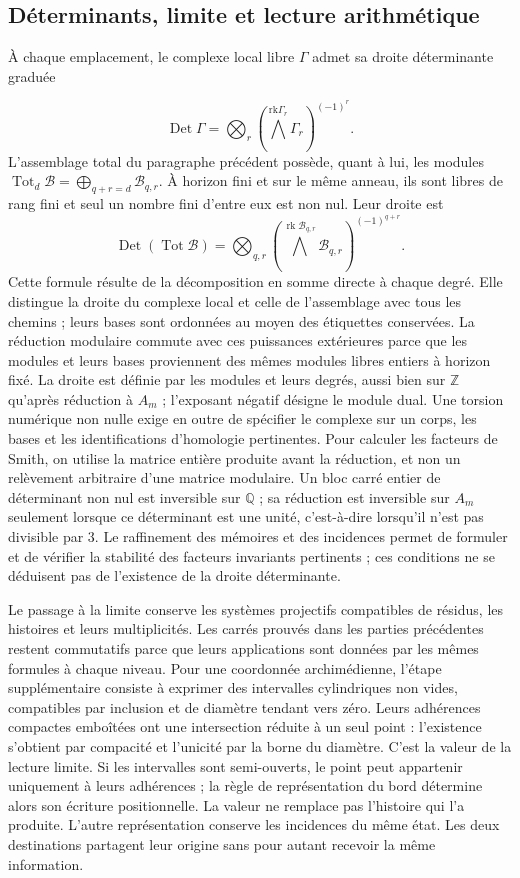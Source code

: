 \subsection{Déterminants, limite et lecture arithmétique}
À chaque emplacement, le complexe local libre \(\Gamma\) admet sa droite déterminante graduée

\[
\operatorname{Det}\Gamma=
\bigotimes_r\left(\bigwedge^{\mathrm{rk}\Gamma_r}\Gamma_r\right)^{(-1)^r}.
\]
L'assemblage total du paragraphe précédent possède, quant à lui, les modules \(\operatorname{Tot}_d\mathcal B=\bigoplus_{q+r=d}\mathcal B_{q,r}\). À horizon fini et sur le même anneau, ils sont libres de rang fini et seul un nombre fini d'entre eux est non nul. Leur droite est
\[
\operatorname{Det}(\operatorname{Tot}\mathcal B)=
\bigotimes_{q,r}
\left(\bigwedge^{\operatorname{rk}\mathcal B_{q,r}}
\mathcal B_{q,r}\right)^{(-1)^{q+r}}.
\]
Cette formule résulte de la décomposition en somme directe à chaque degré. Elle distingue la droite du complexe local et celle de l'assemblage avec tous les chemins ; leurs bases sont ordonnées au moyen des étiquettes conservées. La réduction modulaire commute avec ces puissances extérieures parce que les modules et leurs bases proviennent des mêmes modules libres entiers à horizon fixé.
La droite est définie par les modules et leurs degrés, aussi bien sur \(\mathbb Z\) qu'après réduction à \(A_m\) ; l'exposant négatif désigne le module dual. Une torsion numérique non nulle exige en outre de spécifier le complexe sur un corps, les bases et les identifications d'homologie pertinentes. Pour calculer les facteurs de Smith, on utilise la matrice entière produite avant la réduction, et non un relèvement arbitraire d'une matrice modulaire. Un bloc carré entier de déterminant non nul est inversible sur \(\mathbb Q\) ; sa réduction est inversible sur \(A_m\) seulement lorsque ce déterminant est une unité, c'est-à-dire lorsqu'il n'est pas divisible par \(3\). Le raffinement des mémoires et des incidences permet de formuler et de vérifier la stabilité des facteurs invariants pertinents ; ces conditions ne se déduisent pas de l'existence de la droite déterminante.

Le passage à la limite conserve les systèmes projectifs compatibles de résidus, les histoires et leurs multiplicités. Les carrés prouvés dans les parties précédentes restent commutatifs parce que leurs applications sont données par les mêmes formules à chaque niveau. Pour une coordonnée archimédienne, l’étape supplémentaire consiste à exprimer des intervalles cylindriques non vides, compatibles par inclusion et de diamètre tendant vers zéro. Leurs adhérences compactes emboîtées ont une intersection réduite à un seul point : l’existence s’obtient par compacité et l’unicité par la borne du diamètre. C’est la valeur de la lecture limite. Si les intervalles sont semi-ouverts, le point peut appartenir uniquement à leurs adhérences ; la règle de représentation du bord détermine alors son écriture positionnelle. La valeur ne remplace pas l’histoire qui l’a produite. L’autre représentation conserve les incidences du même état. Les deux destinations partagent leur origine sans pour autant recevoir la même information.

